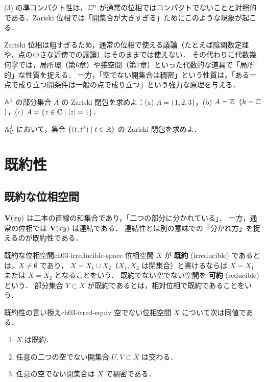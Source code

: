(3) の準コンパクト性は，$\mathbb{C}^n$ が通常の位相ではコンパクトでないことと対照的である．Zariski 位相では「開集合が大きすぎる」ためにこのような現象が起こる．

\begin{note}
Zariski 位相は粗すぎるため，通常の位相で使える議論（たとえば陰関数定理や，点の小さな近傍での議論）はそのままでは使えない．
その代わりに代数幾何学では，局所環（第6章）や接空間（第7章）といった代数的な道具で「局所的」な性質を捉える．
一方，「空でない開集合は稠密」という性質は，「ある一点で成り立つ開条件は一般の点で成り立つ」という強力な原理を与える．
\end{note}

 $\mathbb{A}^1$ の部分集合 $A$ の Zariski 閉包を求めよ：(a) $A=\{1,2,3\}$，(b) $A=\mathbb{Z}$（$k=\mathbb{C}$），(c) $A=\{z\in\mathbb{C}\mid|z|=1\}$．

 $\mathbb{A}^2_{\mathbb{C}}$ において，集合 $\{(t,t^2)\mid t\in\mathbb{R}\}$ の Zariski 閉包を求めよ．

\section{既約性}
\label{sec:ch03-irred}

\subsection{既約な位相空間}

$\mathbf{V}(xy)$ は二本の直線の和集合であり，「二つの部分に分かれている」．
一方，通常の位相では $\mathbf{V}(xy)$ は連結である．
連結性とは別の意味での「分かれ方」を捉えるのが既約性である．

\begin{mydef}{既約な位相空間}{ch03-irreducible-space}
位相空間 $X$ が \textbf{既約} (irreducible) であるとは，$X\ne\emptyset$ であり，
$X=X_1\cup X_2$（$X_1,X_2$ は閉集合）と書けるならば $X=X_1$ または $X=X_2$ となることをいう．
既約でない空でない空間を \textbf{可約} (reducible) という．
部分集合 $Y\subset X$ が既約であるとは，相対位相で既約であることをいう．
\end{mydef}

\begin{mylem}{既約性の言い換え}{ch03-irred-equiv}
空でない位相空間 $X$ について次は同値である．
\begin{enumerate}
  \item $X$ は既約．
  \item 任意の二つの空でない開集合 $U,V\subset X$ は交わる．
  \item 任意の空でない開集合は $X$ で稠密である．
\end{enumerate}
\end{mylem}

